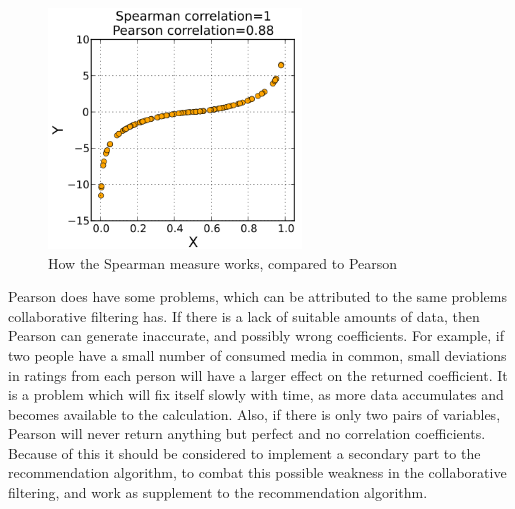 \begin{figure}[htb]
\centering
\includegraphics[width=0.6\textwidth]{Images/spearman.png}
\caption{How the Spearman measure works, compared to Pearson \cite{Spearman2}}
\label{Spearman}
\end{figure}

Pearson does have some problems, which can be attributed to the same problems collaborative filtering has. If there is a lack of suitable amounts of data, then Pearson can generate inaccurate, and possibly wrong coefficients. For example, if two people have a small number of consumed media in common, small deviations in ratings from each person will have a larger effect on the returned coefficient. It is a problem which will fix itself slowly with time, as more data accumulates and becomes available to the calculation. Also, if there is only two pairs of variables, Pearson will never return anything but perfect and no correlation coefficients. Because of this it should be considered to implement a secondary part to the recommendation algorithm, to combat this possible weakness in the collaborative filtering, and work as supplement to the recommendation algorithm.


